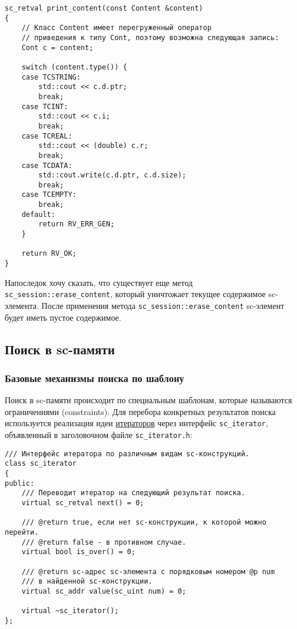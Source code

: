 \begin{lstlisting}[texcl]
sc_retval print_content(const Content &content)
{
    // Класс Content имеет перегруженный оператор
    // приведения к типу Cont, поэтому возможна следующая запись:
    Cont c = content;

    switch (content.type()) {
    case TCSTRING:
        std::cout << c.d.ptr;
        break;
    case TCINT:
        std::cout << c.i;
        break;
    case TCREAL:
        std::cout << (double) c.r;
        break;
    case TCDATA:
        std::cout.write(c.d.ptr, c.d.size);
        break;
    case TCEMPTY:
        break;
    default:
        return RV_ERR_GEN;
    }

    return RV_OK;
}
\end{lstlisting}

Напоследок хочу сказать, что существует еще метод
\lstinline|sc_session::erase_content|, который уничтожает текущее
содержимое sc-элемента. После применения метода
\lstinline|sc_session::erase_content| sc-элемент будет иметь пустое
содержимое.

\subsection{Поиск в sc-памяти}
\label{sec:libsc_search}

\subsubsection{Базовые механизмы поиска по шаблону}
\label{sec:libsc_search_basic}

Поиск в sc-памяти происходит по специальным шаблонам, которые
называются ограничениями (constraints). Для перебора конкретных
результатов поиска используется реализация идеи
\href{http://ru.wikipedia.org/wiki/%D0%98%D1%82%D0%B5%D1%80%D0%B0%D1%82%D0%BE%D1%80}{итераторов}
через
интерфейс \lstinline|sc_iterator|, объявленный в заголовочном файле
\verb|sc_iterator.h|:

\begin{lstlisting}[texcl]
/// Интерфейс итератора по различным видам sc-конструкций.
class sc_iterator
{
public:
    /// Переводит итератор на следующий результат поиска.
    virtual sc_retval next() = 0;

    /// @return true, если нет sc-конструкции, к которой можно перейти.
    /// @return false - в противном случае.
    virtual bool is_over() = 0;

    /// @return sc-адрес sc-элемента с порядковым номером @p num
    /// в найденной sc-конструкции.
    virtual sc_addr value(sc_uint num) = 0;

    virtual ~sc_iterator();
};
\end{lstlisting}

